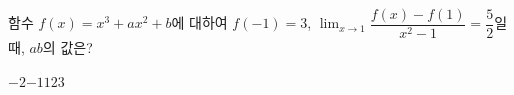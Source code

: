 함수 $f(x)=x^3+ax^2+b$에 대하여 $f(-1)=3$, $\displaystyle\lim_{x\to 1}\dfrac{f(x)-f(1)}{x^2-1}=\dfrac{5}{2}$일 때, $ab$의 값은? 
\begin{choices32}{$-2$}{$-1$}{$1$}{$2$}{$3$}\end{choices32}

